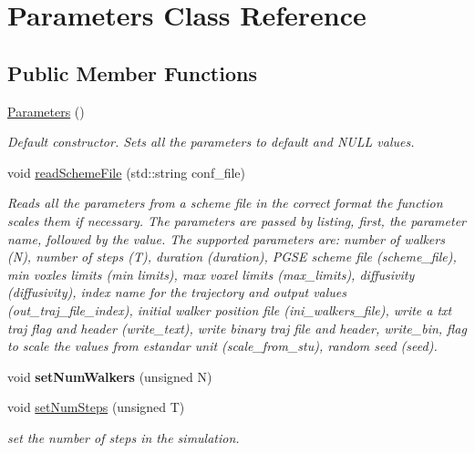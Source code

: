 \hypertarget{class_parameters}{}\section{Parameters Class Reference}
\label{class_parameters}
\subsection*{Public Member Functions}
\begin{DoxyCompactItemize}
\item 
\mbox{\label{class_parameters_af4d94ee360ac0157d9065f78797fe9a1}} 
\hyperlink{class_parameters_af4d94ee360ac0157d9065f78797fe9a1}{Parameters} ()
\begin{DoxyCompactList}\small\item\em Default constructor. Sets all the parameters to default and N\+U\+LL values. \end{DoxyCompactList}\item 
void \hyperlink{class_parameters_afa8dd9d59fa727c3c2b2fe366efb2c14}{read\+Scheme\+File} (std\+::string conf\+\_\+file)
\begin{DoxyCompactList}\small\item\em Reads all the parameters from a scheme file in the correct format the function scales them if necessary. The parameters are passed by listing, first, the parameter name, followed by the value. The supported parameters are\+: number of walkers (N), number of steps (T), duration (duration), P\+G\+SE scheme file (scheme\+\_\+file), min voxles limits (min limits), max voxel limits (max\+\_\+limits), diffusivity (diffusivity), index name for the trajectory and output values (out\+\_\+traj\+\_\+file\+\_\+index), initial walker position file (ini\+\_\+walkers\+\_\+file), write a txt traj flag and header (write\+\_\+text), write binary traj file and header, write\+\_\+bin, flag to scale the values from estandar unit (scale\+\_\+from\+\_\+stu), random seed (seed). \end{DoxyCompactList}\item 
\mbox{\label{class_parameters_a666f753268b273d35f9623f0754e67ce}} 
void {\bfseries set\+Num\+Walkers} (unsigned N)
\item 
void \hyperlink{class_parameters_af61156929c1abed67da0a1c9920ca508}{set\+Num\+Steps} (unsigned T)
\begin{DoxyCompactList}\small\item\em set the number of steps in the simulation. \end{DoxyCompactList}\item 

\end{DoxyCompactItemize}
